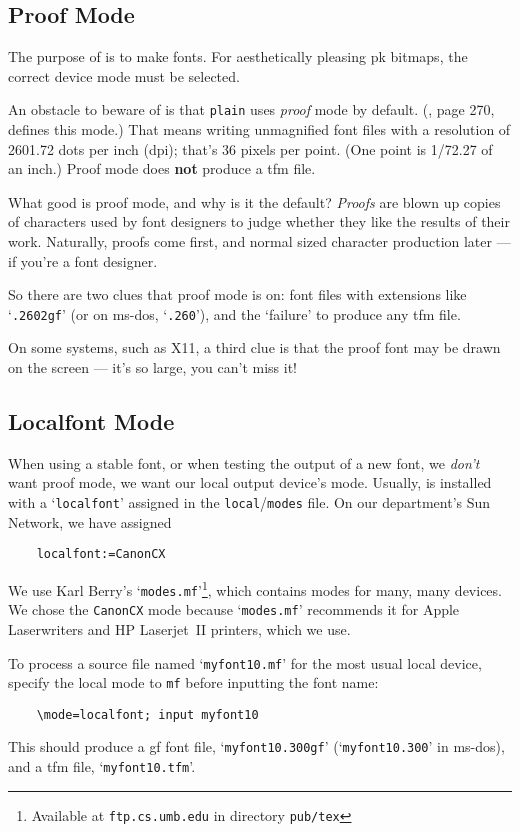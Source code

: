 \subsection{Proof Mode}\label{sub:proof}

The purpose of \MF{} is to make fonts.  For aesthetically pleasing
{\sc pk} bitmaps, the correct device mode must be selected.

An obstacle to beware of is that {\tt plain} \MF{} uses
{\em proof\/} mode by default.
(\MFbook{}, page 270, defines this mode.)
That means writing unmagnified font files with a resolution of
2601.72 dots per inch (dpi); that's 36 pixels per point.  (One
point is 1/72.27 of an inch.)  Proof mode does {\bf not} produce a
{\sc tfm} file.

What good is proof mode, and why is it the default?
{\em Proofs\/} are blown up copies of characters used by font
designers to judge whether they like the results of their work.
Naturally, proofs come first, and normal sized character production
later --- if you're a font designer.

So there are two clues that proof mode is on:  font files with
extensions like `{\tt .2602gf}' (or on {\sc ms-dos}, `{\tt .260}'),
and the `failure' to produce any {\sc tfm} file.

On some systems, such as {\sc X11}, a third clue is that the proof
font may be drawn on the screen --- it's so large, you can't miss it!


\subsection{Localfont Mode}\label{sub:localfont}

When using a stable font, or when testing the output of a new font,
we {\em don't\/} want proof mode,
we want our local output device's mode.
Usually, \MF{} is installed with a `{\tt localfont}'
assigned in the {\tt local}/{\tt modes} file.
On our department's Sun Network, we have assigned
\begin{verbatim}
    localfont:=CanonCX
\end{verbatim}
We use Karl {\sc Berry\/}'s `{\tt modes.mf}'\footnote
{Available at {\tt ftp.cs.umb.edu} in directory {\tt pub/tex}},
which contains modes for many, many devices.  We chose the
{\tt CanonCX} mode because `{\tt modes.mf}' recommends it for Apple
Laserwriters and HP Laserjet~II printers, which we use.

To process a \MF{} source file named `{\tt myfont10.mf}' for the most
usual local device, specify the local mode to {\tt mf} before
inputting the font name:
\begin{verbatim}
    \mode=localfont; input myfont10
\end{verbatim}
This should produce a {\sc gf} font file, `{\tt myfont10.300gf}'
(`{\tt myfont10.300}' in {\sc ms-dos}),
and a {\sc tfm} file, `{\tt myfont10.tfm}'.


